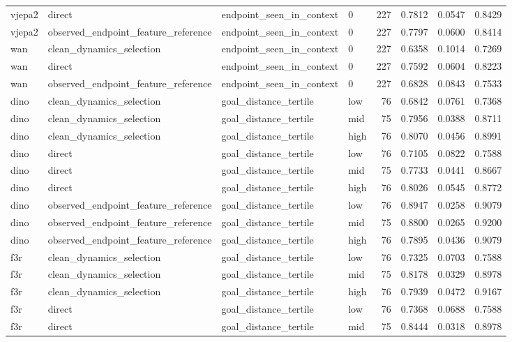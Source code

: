 \begin{tabular}{llllrrrr}
vjepa2 & direct & endpoint\_seen\_in\_context & 0 & 227 & 0.7812 & 0.0547 & 0.8429 \\
vjepa2 & observed\_endpoint\_feature\_reference & endpoint\_seen\_in\_context & 0 & 227 & 0.7797 & 0.0600 & 0.8414 \\
wan & clean\_dynamics\_selection & endpoint\_seen\_in\_context & 0 & 227 & 0.6358 & 0.1014 & 0.7269 \\
wan & direct & endpoint\_seen\_in\_context & 0 & 227 & 0.7592 & 0.0604 & 0.8223 \\
wan & observed\_endpoint\_feature\_reference & endpoint\_seen\_in\_context & 0 & 227 & 0.6828 & 0.0843 & 0.7533 \\
dino & clean\_dynamics\_selection & goal\_distance\_tertile & low & 76 & 0.6842 & 0.0761 & 0.7368 \\
dino & clean\_dynamics\_selection & goal\_distance\_tertile & mid & 75 & 0.7956 & 0.0388 & 0.8711 \\
dino & clean\_dynamics\_selection & goal\_distance\_tertile & high & 76 & 0.8070 & 0.0456 & 0.8991 \\
dino & direct & goal\_distance\_tertile & low & 76 & 0.7105 & 0.0822 & 0.7588 \\
dino & direct & goal\_distance\_tertile & mid & 75 & 0.7733 & 0.0441 & 0.8667 \\
dino & direct & goal\_distance\_tertile & high & 76 & 0.8026 & 0.0545 & 0.8772 \\
dino & observed\_endpoint\_feature\_reference & goal\_distance\_tertile & low & 76 & 0.8947 & 0.0258 & 0.9079 \\
dino & observed\_endpoint\_feature\_reference & goal\_distance\_tertile & mid & 75 & 0.8800 & 0.0265 & 0.9200 \\
dino & observed\_endpoint\_feature\_reference & goal\_distance\_tertile & high & 76 & 0.7895 & 0.0436 & 0.9079 \\
f3r & clean\_dynamics\_selection & goal\_distance\_tertile & low & 76 & 0.7325 & 0.0703 & 0.7588 \\
f3r & clean\_dynamics\_selection & goal\_distance\_tertile & mid & 75 & 0.8178 & 0.0329 & 0.8978 \\
f3r & clean\_dynamics\_selection & goal\_distance\_tertile & high & 76 & 0.7939 & 0.0472 & 0.9167 \\
f3r & direct & goal\_distance\_tertile & low & 76 & 0.7368 & 0.0688 & 0.7588 \\
f3r & direct & goal\_distance\_tertile & mid & 75 & 0.8444 & 0.0318 & 0.8978 \\

\end{tabular}
